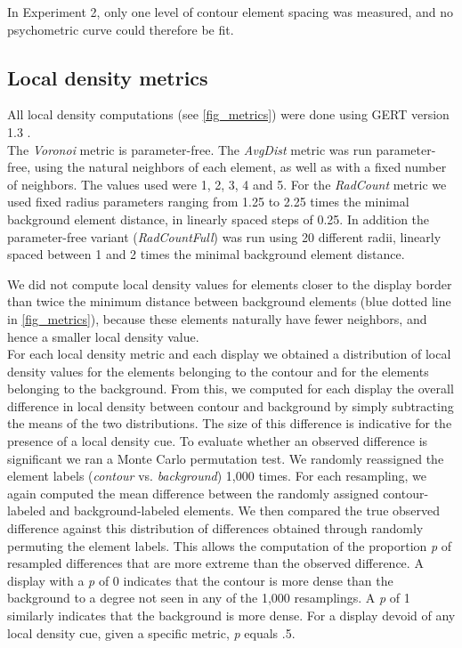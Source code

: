 \documentclass[12pt]{article}
\begin{document}
In Experiment 2, only one level of contour element spacing was measured, and no psychometric curve could therefore be fit.


\subsection{Local density metrics}\label{subsection_methods_metrics}

All local density computations (see \autoref{fig_metrics}) were done using GERT version 1.3 \cite{Demeyer12}. \\

The \emph{Voronoi} metric is parameter-free. The \emph{AvgDist} metric was run parameter-free, using the natural neighbors of each element, as well as with a fixed number of neighbors. The values used were 1, 2, 3, 4 and 5. For the \emph{RadCount} metric we used fixed radius parameters ranging from 1.25 to 2.25 times the minimal background element distance, in linearly spaced steps of 0.25. In addition the parameter-free variant (\emph{RadCountFull}) was run using 20 different radii, linearly spaced between 1 and 2 times the minimal background element distance.

We did not compute local density values for elements closer to the display border than twice the minimum distance between background elements (blue dotted line in \autoref{fig_metrics}), because these elements naturally have fewer neighbors, and hence a smaller local density value.\\

For each local density metric and each display we obtained a distribution of local density values for the elements belonging to the contour and for the elements belonging to the background. From this, we computed for each display the overall difference in local density between contour and background by simply subtracting the means of the two distributions. The size of this difference is indicative for the presence of a local density cue. To evaluate whether an observed difference is significant we ran a Monte Carlo permutation test. We randomly reassigned the element labels (\emph{contour} vs. \emph{background}) 1,000 times. For each resampling, we again computed the mean difference between the randomly assigned contour-labeled and background-labeled elements. We then compared the true observed difference against this distribution of differences obtained through randomly permuting the element labels. This allows the computation of the proportion \emph{p} of resampled differences that are more extreme than the observed difference. A display with a \emph{p} of 0 indicates that the contour is more dense than the background to a degree not seen in any of the 1,000 resamplings. A \emph{p} of 1 similarly indicates that the background is more dense. For a display devoid of any local density cue, given a specific metric, \emph{p} equals .5.\\
\end{document}
